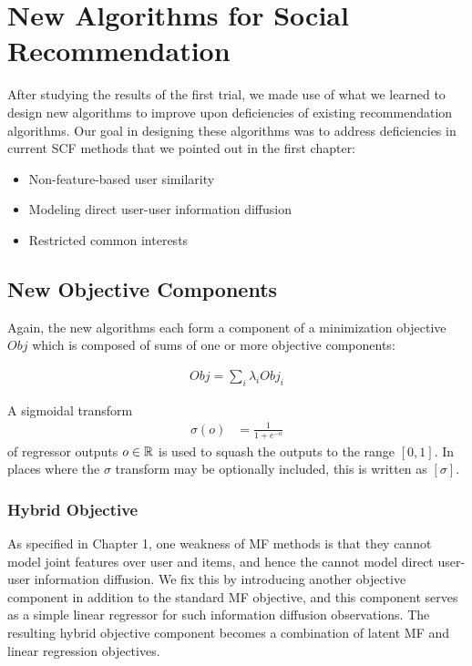 \chapter{New Algorithms for Social Recommendation}

After studying the results of the first trial, we made use of what we learned to design new algorithms to improve upon deficiencies of existing recommendation algorithms. Our goal in designing these algorithms was to address deficiencies in current SCF methods that we pointed out in the first chapter:

\begin{itemize}
\item {Non-feature-based user similarity}
\item {Modeling direct user-user information diffusion}
\item {Restricted common interests}
\end{itemize}

\section{New Objective Components}

Again, the new algorithms each form a component of a minimization objective $Obj$ which is composed of sums of one or more objective components:

\begin{align}
\mathit{Obj} = \sum_i \lambda_i \mathit{Obj}_i
\end{align}

A sigmoidal transform 
\begin{align}
\sigma(o) & = \frac{1}{1 + e^{-o}}
\end{align}
of regressor outputs $o \in \mathbb{R}$ is used to squash the outputs 
to the range $[0, 1]$.  
In places where the $\sigma$ transform may be optionally included, 
this is written as $[\sigma]$.  

\subsection{Hybrid Objective}

As specified in Chapter 1, one weakness of  MF methods is that they cannot model joint features over user and items, and hence the cannot model direct user-user information diffusion. We fix this by introducing another objective component in addition to the standard MF objective, and this component serves as a simple linear regressor for such information diffusion observations. The resulting hybrid objective component becomes a combination of latent MF and linear regression objectives.

